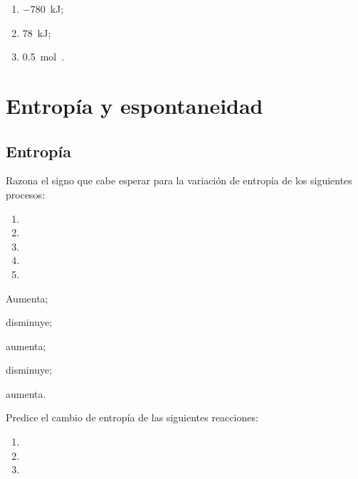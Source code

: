 \documentclass[10pt,a5paper,twoside]{article}
\begin{document}
  \begin{solution}
    \begin{enumerate}
      \item \SI{-780}{\kilo\joule};
      \item \SI{78}{\kilo\joule};
      \item \SI{0.5}{\mole{}}.
    \end{enumerate}
  \end{solution}






\section{Entropía y espontaneidad}

  \subsection*{Entropía}

  \begin{exercise}[
      tags    = {termodinámica, entropía},
      topics  = {química, termoquímica, termodinámica},
      source  = {},
    ]
    Razona el signo que cabe esperar para la variación de entropía de los siguientes procesos:
    \begin{enumerate}
      \item {}
      \item {}
      \item {}
      \item {}
      \item {}
    \end{enumerate}
  \end{exercise}

  \begin{solution}
    \begin{enumerate*}
      \item Aumenta;
      \item disminuye;
      \item aumenta;
      \item disminuye;
      \item aumenta.
    \end{enumerate*}
  \end{solution}




  \begin{exercise}[
      tags    = {termodinámica, entropía},
      topics  = {química, termoquímica, termodinámica},
      source  = {},
    ]
    Predice el cambio de entropía de las siguientes reacciones:
    \begin{enumerate}
      \item {}
      \item {}
      \item {}
    \end{enumerate}
  \end{exercise}
\end{document}
